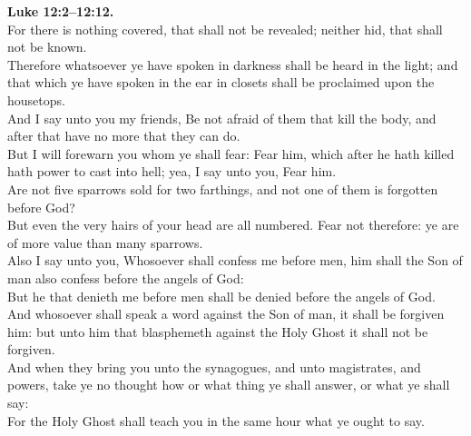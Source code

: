 \documentclass[10pt]{article} %
\begin{document}
{\begin{minipage}[t]{0.45\textwidth}
\textbf{Luke 12:2--12:12.}\\
For there is nothing covered, that shall not be revealed; neither hid, that shall not be known.\\
Therefore whatsoever ye have spoken in darkness shall be heard in the light; and that which ye have spoken in the ear in closets shall be proclaimed upon the housetops.\\
And I say unto you my friends, Be not afraid of them that kill the body, and after that have no more that they can do.\\
But I will forewarn you whom ye shall fear: Fear him, which after he hath killed hath power to cast into hell; yea, I say unto you, Fear him.\\
Are not five sparrows sold for two farthings, and not one of them is forgotten before God?\\
But even the very hairs of your head are all numbered. Fear not therefore: ye are of more value than many sparrows.\\
Also I say unto you, Whosoever shall confess me before men, him shall the Son of man also confess before the angels of God:\\
But he that denieth me before men shall be denied before the angels of God.\\
And whosoever shall speak a word against the Son of man, it shall be forgiven him: but unto him that blasphemeth against the Holy Ghost it shall not be forgiven.\\
And when they bring you unto the synagogues, and unto magistrates, and powers, take ye no thought how or what thing ye shall answer, or what ye shall say:\\
For the Holy Ghost shall teach you in the same hour what ye ought to say.
\end{minipage}}
\vspace*{\fill}
\newpage
\Huge%
\vspace*{\fill}
\end{document}
